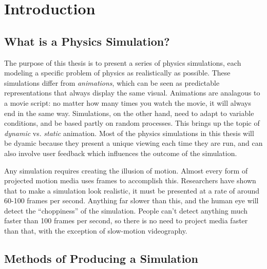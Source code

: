 
\chapter*{Introduction}
\label{intro} %



\section{What is a Physics Simulation?}

\hspace{.5cm} The purpose of this thesis is to present a series of physics simulations, each modeling a specific problem of physics as realistically as possible.  These simulations differ from \textit{animations}, which can be seen as predictable representations that always display the same visual.  Animations are analagous to a movie script: no matter how many times you watch the movie, it will always end in the same way.  Simulations, on the other hand, need to adapt to variable conditions, and be based partly on random processes.  This brings up the topic of \textit{dynamic} vs. \textit{static} animation.  Most of the physics simulations in this thesis will be dyamic because they present a unique viewing each time they are run, and can also involve user feedback which influences the outcome of the simulation.

Any simulation requires creating the illusion of motion.  Almost every form of projected motion media uses frames to accomplish this.  Researchers have shown that to make a simulation look realistic, it must be presented at a rate of around 60-100 frames per second.  Anything far slower than this, and the human eye will detect the ``choppiness'' of the simulation.  People can't detect anything much faster than 100 frames per second, so there is no need to project media faster than that, with the exception of slow-motion videography.  






\section{Methods of Producing a Simulation}

